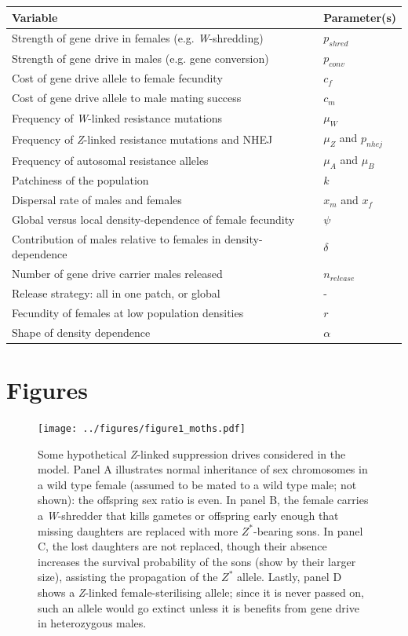 \documentclass[]{rsos}%
\begin{document}
\begin{table}[ht]
\centering
\begin{tabular}{ll}
  \hline
Variable & Parameter(s) \\ 
  \hline
Strength of gene drive in females (e.g. \textit{W}-shredding) & $p_{shred}$ \\ 
  Strength of gene drive in males (e.g. gene conversion) & $p_{conv}$ \\ 
  Cost of gene drive allele to female fecundity & $c_f$ \\ 
  Cost of gene drive allele to male mating success & $c_m$ \\ 
  Frequency of \textit{W}-linked resistance mutations & $\mu_W$ \\ 
  Frequency of \textit{Z}-linked resistance mutations and NHEJ & $\mu_Z$ and $p_{nhej}$ \\ 
  Frequency of autosomal resistance alleles & $\mu_A$ and $\mu_B$ \\ 
  Patchiness of the population & $k$ \\ 
  Dispersal rate of males and females & $x_m$ and $x_f$ \\ 
  Global versus local density-dependence of female fecundity & $\psi$ \\ 
  Contribution of males relative to females in density-dependence & $\delta$ \\ 
  Number of gene drive carrier males released & $n_{release}$ \\ 
  Release strategy: all in one patch, or global & - \\ 
  Fecundity of females at low population densities & $r$ \\ 
  Shape of density dependence & $\alpha$ \\ 
   \hline
\end{tabular}
\end{table}

\newpage

\hypertarget{figures}{%
\section{Figures}\label{figures}}

\begin{figure}[h]
\centering
\texttt{[image: ../figures/figure1\_moths.pdf]}
\caption{\footnotesize{Some hypothetical \textit{Z}-linked suppression drives considered in the model. Panel A illustrates normal inheritance of sex chromosomes in a wild type female (assumed to be mated to a wild type male; not shown): the offspring sex ratio is even. In panel B, the female carries a \textit{W}-shredder that kills gametes or offspring early enough that missing daughters are replaced with more $Z^*$-bearing sons. In panel C, the lost daughters are not replaced, though their absence increases the survival probability of the sons (show by their larger size), assisting the propagation of the $Z^*$ allele. Lastly, panel D shows a \textit{Z}-linked female-sterilising allele; since it is never passed on, such an allele would go extinct unless it is benefits from gene drive in heterozygous males.}}
\end{figure}
\newpage
\end{document}
